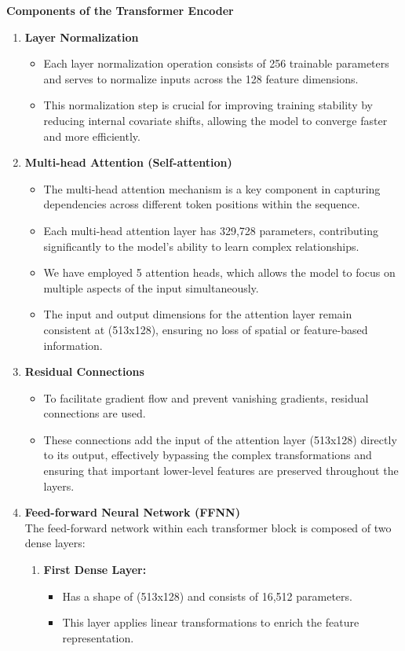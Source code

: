 \textbf{Components of the Transformer Encoder}
\begin{enumerate}[label=\textbf{\roman*})]
    \item \textbf{Layer Normalization}
    \begin{itemize}
        \item Each layer normalization operation consists of 256 trainable parameters and serves to normalize inputs across the 128 feature dimensions.
        \item This normalization step is crucial for improving training stability by reducing internal covariate shifts, allowing the model to converge faster and more efficiently.
    \end{itemize}
    
    \item \textbf{Multi-head Attention (Self-attention)}
    \begin{itemize}
        \item The multi-head attention mechanism is a key component in capturing dependencies across different token positions within the sequence.
        \item Each multi-head attention layer has 329,728 parameters, contributing significantly to the model's ability to learn complex relationships.
        \item We have employed 5 attention heads, which allows the model to focus on multiple aspects of the input simultaneously.
        \item The input and output dimensions for the attention layer remain consistent at (513x128), ensuring no loss of spatial or feature-based information.
    \end{itemize}
    
    \item \textbf{Residual Connections}
    \begin{itemize}
        \item To facilitate gradient flow and prevent vanishing gradients, residual connections are used.
        \item These connections add the input of the attention layer (513x128) directly to its output, effectively bypassing the complex transformations and ensuring that important lower-level features are preserved throughout the layers.
    \end{itemize}
    
    \item \textbf{Feed-forward Neural Network (FFNN)}\\
    The feed-forward network within each transformer block is composed of two dense layers:
    \begin{enumerate}
        \item \textbf{First Dense Layer:}
        \begin{itemize}
            \item Has a shape of (513x128) and consists of 16,512 parameters.
            \item This layer applies linear transformations to enrich the feature representation.
        \end{itemize}
        

\end{enumerate}
\end{enumerate}
